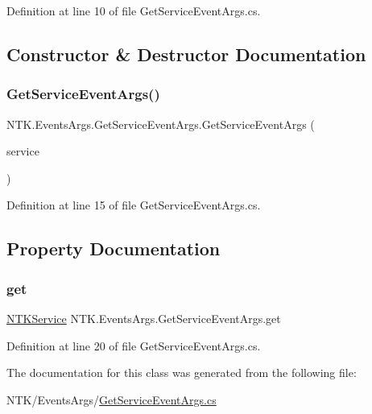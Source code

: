 Definition at line 10 of file Get\+Service\+Event\+Args.\+cs.



\subsection{Constructor \& Destructor Documentation}
\mbox{\label{class_n_t_k_1_1_events_args_1_1_get_service_event_args_a72494743334dc798efd1278b657c2bf3}} 
\subsubsection{\texorpdfstring{GetServiceEventArgs()}{GetServiceEventArgs()}}
{\footnotesize\ttfamily N\+T\+K.\+Events\+Args.\+Get\+Service\+Event\+Args.\+Get\+Service\+Event\+Args (\begin{DoxyParamCaption}\item[{\mbox{\hyperlink{class_n_t_k_1_1_service_1_1_n_t_k_service}{N\+T\+K\+Service}}}]{service }\end{DoxyParamCaption})}



Definition at line 15 of file Get\+Service\+Event\+Args.\+cs.



\subsection{Property Documentation}
\mbox{\label{class_n_t_k_1_1_events_args_1_1_get_service_event_args_aad50726dafa000bb725f2fe277c26a29}} 
\subsubsection{\texorpdfstring{get}{get}}
{\footnotesize\ttfamily \mbox{\hyperlink{class_n_t_k_1_1_service_1_1_n_t_k_service}{N\+T\+K\+Service}} N\+T\+K.\+Events\+Args.\+Get\+Service\+Event\+Args.\+get\hspace{0.3cm}{\ttfamily [get]}}



Definition at line 20 of file Get\+Service\+Event\+Args.\+cs.



The documentation for this class was generated from the following file\+:\begin{DoxyCompactItemize}
\item 
N\+T\+K/\+Events\+Args/\mbox{\hyperlink{_get_service_event_args_8cs}{Get\+Service\+Event\+Args.\+cs}}\end{DoxyCompactItemize}

